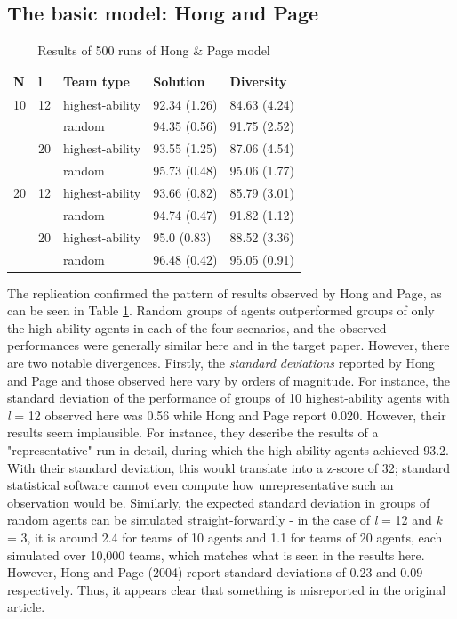 \subsection{The basic model: Hong and Page}

\begin{table}[htbp]
    \centering
    \begin{tabular}{lllll}
      \toprule
      N & l & Team type &        Solution       & Diversity\\
      \midrule
      10 & 12 & highest-ability &  92.34 (1.26) &  84.63 (4.24) \\
         &    & random &  94.35 (0.56) &  91.75 (2.52) \\
         & 20 & highest-ability &  93.55 (1.25) &  87.06 (4.54) \\
         &    & random &  95.73 (0.48) &  95.06 (1.77) \\
      \midrule
      20 & 12 & highest-ability &  93.66 (0.82) &  85.79 (3.01) \\
         &    & random &  94.74 (0.47) &  91.82 (1.12) \\
         & 20 & highest-ability &   95.0 (0.83) &  88.52 (3.36) \\
         &    & random &  96.48 (0.42) &  95.05 (0.91) \\
      \bottomrule
      \end{tabular}
    \caption{\label{tab:HP}Results of 500 runs of Hong \& Page model}
    \end{table}

    
The replication confirmed the pattern of results observed by Hong and Page, as can be seen in Table \ref{tab:HP}. Random groups of agents outperformed groups of only the high-ability agents in each of the four scenarios, and the observed performances were generally similar here and in the target paper. However, there are two notable divergences. Firstly, the \textit{standard deviations} reported by Hong and Page and those observed here vary by orders of magnitude. For instance, the standard deviation of the performance of groups of 10 highest-ability agents with \textit{l} = 12 observed here was 0.56 while Hong and Page report 0.020. However, their results seem  implausible. For instance, they describe the results of a "representative" run in detail, during which the high-ability agents achieved 93.2. With their standard deviation, this would translate into a z-score of 32; standard statistical software cannot even compute how unrepresentative such an observation would be. Similarly, the expected standard deviation in groups of random agents can be simulated straight-forwardly - in the case of \textit{l} = 12 and \textit{k} = 3, it is around 2.4 for teams of 10 agents and 1.1 for teams of 20 agents, each simulated over 10,000 teams, which matches what is seen in the results here. However, Hong and Page (2004) report standard deviations of 0.23 and 0.09 respectively. Thus, it appears clear that something is misreported in the original article. \\

